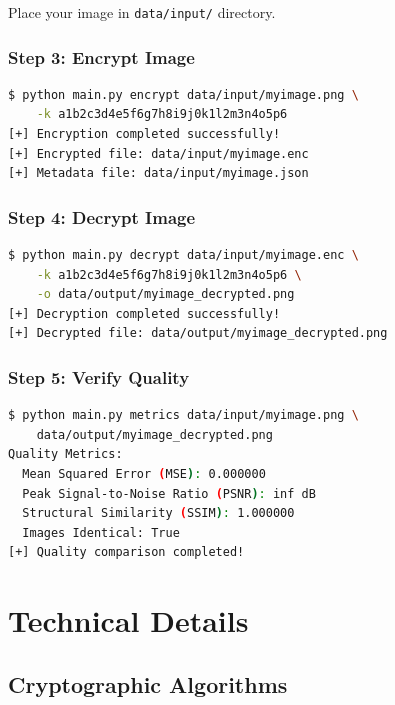 \documentclass[12pt,a4paper]{report}
\begin{document}
Place your image in \texttt{data/input/} directory.

\subsection{Step 3: Encrypt Image}

\begin{lstlisting}[language=bash]
$ python main.py encrypt data/input/myimage.png \
    -k a1b2c3d4e5f6g7h8i9j0k1l2m3n4o5p6
[+] Encryption completed successfully!
[+] Encrypted file: data/input/myimage.enc
[+] Metadata file: data/input/myimage.json
\end{lstlisting}

\subsection{Step 4: Decrypt Image}

\begin{lstlisting}[language=bash]
$ python main.py decrypt data/input/myimage.enc \
    -k a1b2c3d4e5f6g7h8i9j0k1l2m3n4o5p6 \
    -o data/output/myimage_decrypted.png
[+] Decryption completed successfully!
[+] Decrypted file: data/output/myimage_decrypted.png
\end{lstlisting}

\subsection{Step 5: Verify Quality}

\begin{lstlisting}[language=bash]
$ python main.py metrics data/input/myimage.png \
    data/output/myimage_decrypted.png
Quality Metrics:
  Mean Squared Error (MSE): 0.000000
  Peak Signal-to-Noise Ratio (PSNR): inf dB
  Structural Similarity (SSIM): 1.000000
  Images Identical: True
[+] Quality comparison completed!
\end{lstlisting}

\chapter{Technical Details}

\section{Cryptographic Algorithms}
\end{document}
